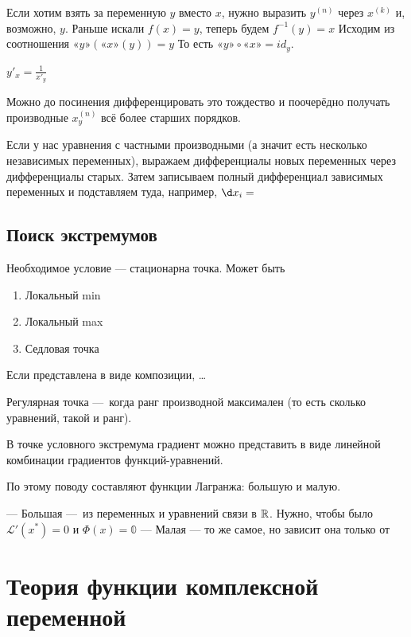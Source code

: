 \documentclass[12pt, a4paper]{article}
\begin{document}
Если хотим взять за переменную $y$ вместо $x$, нужно выразить $y^{(n)}$ через $x^{(k)}$ и, возможно, $y$.
Раньше искали $f(x) = y$, теперь будем $f^{-1}(y) = x$
Исходим из соотношения $«y»(«x»(y)) = y$
То есть $«y» \circ «x» = id_y$.

$y'_x = \frac{1}{x'_y}$

Можно до посинения дифференцировать это тождество 
и поочерёдно получать производные $x^{(n)}_y$ всё более старших порядков.

Если у нас уравнения с частными производными (а значит есть несколько независимых переменных),
выражаем дифференциалы новых переменных через дифференциалы старых. 
Затем записываем полный дифференциал зависимых переменных и подставляем туда, например, $\d x_i = $

\subsection{Поиск экстремумов}

Необходимое условие — стационарна точка.
Может быть

\begin{enumerate}
  \item Локальный min
  \item Локальный max
  \item Седловая точка
\end{enumerate}

Если представлена в виде композиции, …

Регулярная точка — когда ранг производной максимален (то есть сколько уравнений, такой и ранг).

В точке условного экстремума градиент можно представить 
в виде линейной комбинации градиентов функций-уравнений.

По этому поводу составляют функции Лагранжа: большую и малую.

— Большая — из переменных и уравнений связи в ${\mathbb{R}}$. Нужно, чтобы было $\mathcal{L}'(x^*) = 0$ и $\Phi(x) = \mathbb{0}$
— Малая — то же самое, но зависит она только от

\section{Теория функции комплексной переменной}
\end{document}
